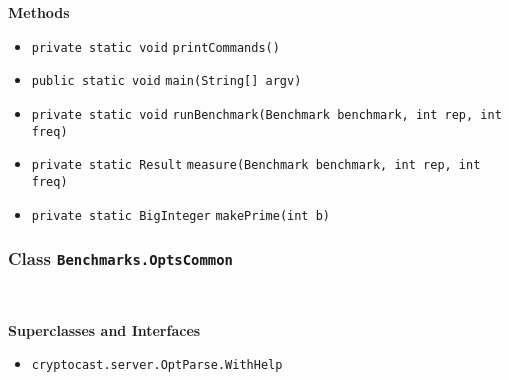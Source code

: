 \textbf{\sffamily Methods}
\begin{itemize}
\item \lstinline|private static void| \lstinline|printCommands|\lstinline|()| \\[-0.6em]




\item \lstinline|public static void| \lstinline|main|\lstinline|(String[] argv)| \\[-0.6em]




\item \lstinline|private static void| \lstinline|runBenchmark|\lstinline|(Benchmark benchmark, int rep, int freq)| \\[-0.6em]




\item \lstinline|private static Result| \lstinline|measure|\lstinline|(Benchmark benchmark, int rep, int freq)| \\[-0.6em]




\item \lstinline|private static BigInteger| \lstinline|makePrime|\lstinline|(int b)| \\[-0.6em]




\end{itemize}

\subsubsection{Class \lstinline|Benchmarks.OptsCommon|}
 \\
\noindent\begin{minipage}[t]{5cm}
\vspace{0.3em}
\hspace*{2em}
\vspace{0.3em}
\end{minipage}



\textbf{\sffamily Superclasses and Interfaces}
\begin{itemize}
\item \lstinline|cryptocast.server.OptParse.WithHelp|
\end{itemize}



